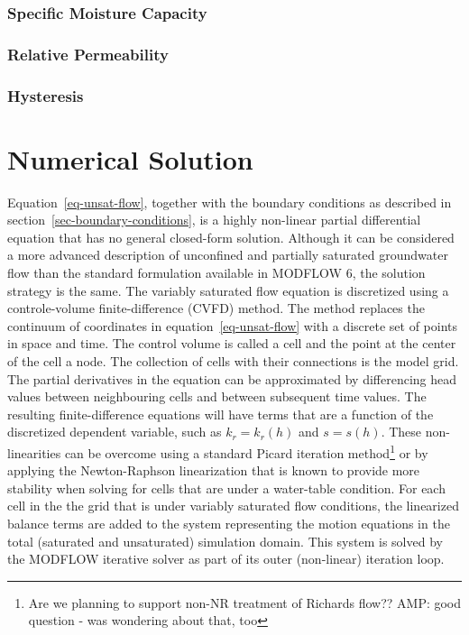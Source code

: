 \documentclass[fleqn]{article}
\begin{document}
\subsubsection{Specific Moisture Capacity}
\subsubsection{Relative Permeability}
\subsubsection{Hysteresis}

\section{Numerical Solution}
Equation~\ref{eq-unsat-flow}, together with the boundary conditions as
described in section~\ref{sec-boundary-conditions}, is a highly non-linear
partial differential equation that has no general closed-form solution.
Although it can be considered a more advanced description of unconfined
and partially saturated groundwater flow than the standard formulation
available in MODFLOW 6, the solution strategy is the same. The variably
saturated flow equation is discretized using a controle-volume
finite-difference (CVFD) method. The method replaces the continuum of
coordinates in equation~\ref{eq-unsat-flow} with a discrete set of 
points in space and time. The control volume is called a cell and the
point at the center of the cell a node. The collection of cells with
their connections is the model grid. The partial derivatives in the
equation can be approximated by differencing head values between 
neighbouring cells and between subsequent time values. The resulting
finite-difference equations will have terms that are a function
of the discretized dependent variable, such as $k_r = k_r(h)$ and 
$s = s(h)$. These non-linearities can be overcome using a standard
Picard iteration method\footnote{Are we planning to support non-NR
  treatment of Richards flow?? AMP: good question - was wondering about that, too} or by applying the Newton-Raphson 
linearization that is known to provide more stability when solving for
cells that are under a water-table condition. For each cell in the
the grid that is under variably saturated flow conditions, the
linearized balance terms are added to the system representing the
motion equations in the total (saturated and unsaturated) simulation 
domain. This system is solved by the MODFLOW iterative solver as part
of its outer (non-linear) iteration loop.
\end{document}
